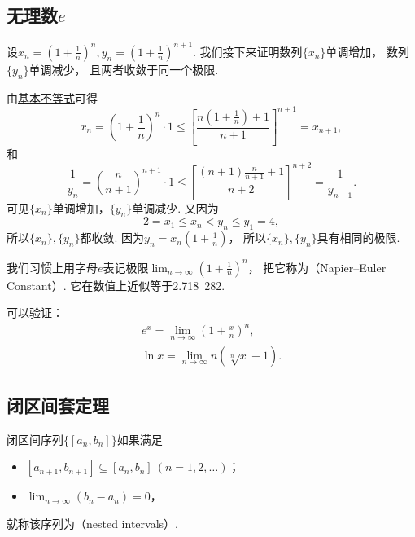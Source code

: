 
\subsection{无理数\texorpdfstring{$e$}{e}}\label{section:极限.无理数e}
设\(x_n=\left(1+\frac1n\right)^n,
y_n=\left(1+\frac1n\right)^{n+1}\).
我们接下来证明数列\(\{x_n\}\)单调增加，
数列\(\{y_n\}\)单调减少，
且两者收敛于同一个极限.

由\hyperref[theorem:不等式.基本不等式n几何平均数与算术平均数]{基本不等式}可得\[
	x_n = \left(1+\frac1n\right)^n \cdot 1
	\leq \left[\frac{n\left(1+\frac1n\right)+1}{n+1}\right]^{n+1} = x_{n+1},
\]
和\[
	\frac1{y_n} = \left(\frac{n}{n+1}\right)^{n+1} \cdot 1
	\leq \left[\frac{(n+1)\frac{n}{n+1}+1}{n+2}\right]^{n+2} = \frac1{y_{n+1}}.
\]
可见\(\{x_n\}\)单调增加，\(\{y_n\}\)单调减少.
又因为\[
	2 = x_1 \leq x_n < y_n \leq y_1 = 4,
\]
所以\(\{x_n\},\{y_n\}\)都收敛.
因为\(y_n=x_n\left(1+\frac1n\right)\)，
所以\(\{x_n\},\{y_n\}\)具有相同的极限.

我们习惯上用字母\(e\)表记极限\(\lim_{n\to\infty} \left(1+\frac1n\right)^n\)，
把它称为（Napier--Euler Constant）.
它在数值上近似等于{2.718~282}.

可以验证：\begin{gather}
	e^x = \lim_{n\to\infty} \left(1+\frac{x}{n}\right)^n,
	\label{equation:特殊函数.以e为底的指数函数} \\
	\ln x = \lim_{n\to\infty} n \left( \sqrt[n]{x} - 1 \right).
	\label{equation:特殊函数.以e为底的对数函数}
\end{gather}

\subsection{闭区间套定理}
\begin{definition}\label{definition:极限.闭区间套的定义}
闭区间序列\(\{[a_n,b_n]\}\)如果满足\begin{itemize}
	\item \([a_{n+1},b_{n+1}] \subseteq [a_n,b_n]\ (n=1,2,\dotsc)\)；
	\item \(\lim_{n\to\infty} (b_n - a_n) = 0\)，
\end{itemize}
就称该序列为（nested intervals）.
\end{definition}

